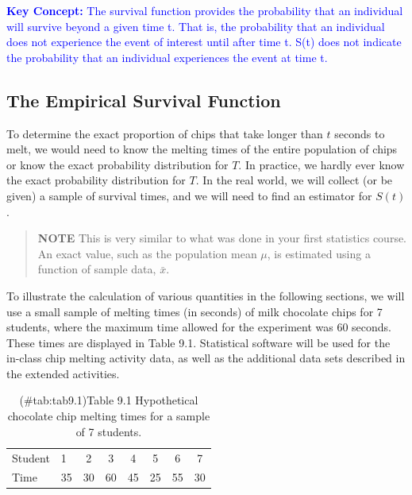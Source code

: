 \documentclass[
]{book}
\begin{document}
\textbf{\textcolor{blue}{Key Concept:}}
\textcolor{blue}{The survival function provides the probability that an individual will survive beyond a given time t. That is, the probability that an individual does not experience the event of interest until after time t. S(t) does not indicate the probability that an individual experiences the event at time t.}

\hypertarget{the-empirical-survival-function}{%
\subsection*{The Empirical Survival Function}\label{the-empirical-survival-function}}

To determine the exact proportion of chips that take longer than \(t\) seconds to melt, we would need to know the melting times of the entire population of chips or know the exact probability distribution for \(T\). In practice, we hardly ever know the exact probability distribution for \(T\). In the real world, we will collect (or be given) a sample of survival times, and we will need to find an estimator for \(S(t)\).

\begin{quote}
\textbf{NOTE} This is very similar to what was done in your first statistics course. An exact value, such as the population mean \(\mu\), is estimated using a function of sample data, \(\bar x\).
\end{quote}

To illustrate the calculation of various quantities in the following sections, we will use a small sample
of melting times (in seconds) of milk chocolate chips for 7 students, where the maximum time allowed for
the experiment was 60 seconds. These times are displayed in Table 9.1. Statistical software will be used
for the in-class chip melting activity data, as well as the additional data sets described in the extended
activities.

\begin{table}[!h]
\centering
\caption{(\#tab:tab9.1)Table 9.1 Hypothetical chocolate chip melting times for a sample of 7 students.}
\centering
\begin{tabular}[t]{llcccccc}
\toprule
  &  &  &  &  &  &  & \\
\midrule
Student & 1 & 2 & 3 & 4 & 5 & 6 & 7\\
Time & 35 & 30 & 60 & 45 & 25 & 55 & 30\\
\bottomrule
\end{tabular}
\end{table}
\end{document}
